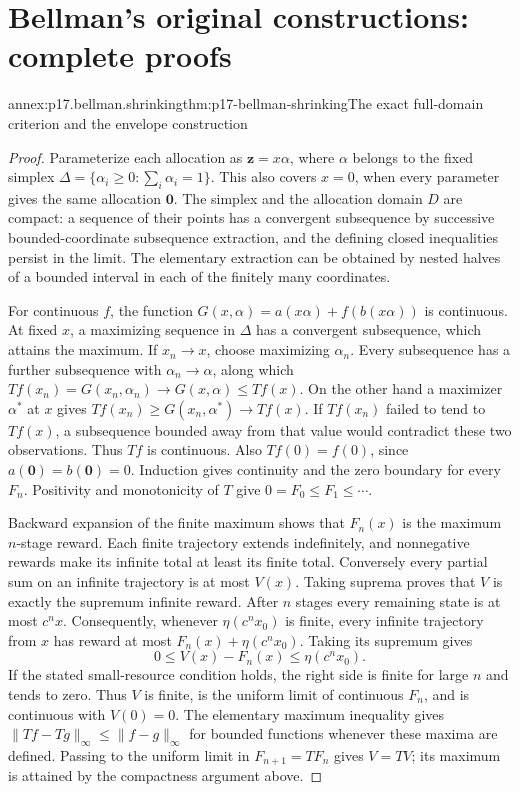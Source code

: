 \section{Bellman's original constructions: complete proofs}
\label{sec:annex-p17-bellman-original-constructions}

\begin{annexitem}{annex:p17.bellman.shrinking}{thm:p17-bellman-shrinking}{The exact full-domain criterion and the envelope construction}
\begin{proof}
Parameterize each allocation as \(\mathbf z=x\alpha\),
where \(\alpha\) belongs to the fixed simplex
\(\Delta=\{\alpha_i\geq0:\sum_i\alpha_i=1\}\).
This also covers \(x=0\), when every parameter gives
the same allocation \(\mathbf0\).
The simplex and the allocation domain \(D\) are compact:
a sequence of their points has a convergent subsequence
by successive bounded-coordinate subsequence extraction,
and the defining closed inequalities persist in the limit.
The elementary extraction can be obtained by nested
halves of a bounded interval in each of the finitely
many coordinates.

For continuous \(f\), the function
\(G(x,\alpha)=a(x\alpha)+f(b(x\alpha))\) is continuous.
At fixed \(x\), a maximizing sequence in \(\Delta\)
has a convergent subsequence, which attains the maximum.
If \(x_n\to x\), choose maximizing \(\alpha_n\).
Every subsequence has a further subsequence with
\(\alpha_n\to\alpha\), along which
\(Tf(x_n)=G(x_n,\alpha_n)\to G(x,\alpha)\leq Tf(x)\).
On the other hand a maximizer \(\alpha^*\) at \(x\)
gives \(Tf(x_n)\geq G(x_n,\alpha^*)\to Tf(x)\).
If \(Tf(x_n)\) failed to tend to \(Tf(x)\), a
subsequence bounded away from that value would
contradict these two observations. Thus \(Tf\)
is continuous. Also \(Tf(0)=f(0)\), since
\(a(\mathbf0)=b(\mathbf0)=0\).
Induction gives continuity and the zero boundary
for every \(F_n\). Positivity and monotonicity
of \(T\) give \(0=F_0\leq F_1\leq\cdots\).

Backward expansion of the finite maximum shows
that \(F_n(x)\) is the maximum \(n\)-stage reward.
Each finite trajectory extends indefinitely,
and nonnegative rewards make its infinite total
at least its finite total. Conversely every
partial sum on an infinite trajectory is at
most \(V(x)\). Taking suprema proves that \(V\)
is exactly the supremum infinite reward.
After \(n\) stages every remaining state is
at most \(c^n x\). Consequently, whenever
\(\eta(c^n x_0)\) is finite, every infinite
trajectory from \(x\) has reward at most
\(F_n(x)+\eta(c^n x_0)\).
Taking its supremum gives
\[
                    0\leq V(x)-F_n(x)\leq\eta(c^n x_0).
\]
If the stated small-resource condition holds,
the right side is finite for large \(n\) and
tends to zero. Thus \(V\) is finite, is the
uniform limit of continuous \(F_n\), and is
continuous with \(V(0)=0\).
The elementary maximum inequality gives
\(\|Tf-Tg\|_\infty\leq\|f-g\|_\infty\)
for bounded functions whenever these maxima
are defined. Passing to the uniform limit
in \(F_{n+1}=TF_n\) gives \(V=TV\);
its maximum is attained by the compactness
argument above.


\end{proof}
\end{annexitem}
